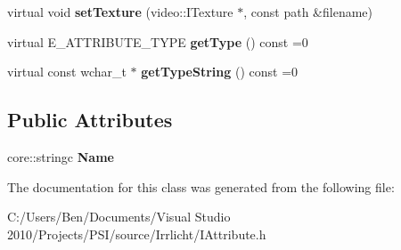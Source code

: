 \begin{DoxyCompactItemize}
\item 
\hypertarget{classirr_1_1io_1_1_i_attribute_ac0bc402be6c541b3f5dbca3fed2302a7}{virtual void {\bfseries set\-Texture} (video\-::\-I\-Texture $\ast$, const path \&filename)}\label{classirr_1_1io_1_1_i_attribute_ac0bc402be6c541b3f5dbca3fed2302a7}

\item 
\hypertarget{classirr_1_1io_1_1_i_attribute_a4d43d7be80a77f6da70fb2b5fbe8085e}{virtual E\-\_\-\-A\-T\-T\-R\-I\-B\-U\-T\-E\-\_\-\-T\-Y\-P\-E {\bfseries get\-Type} () const =0}\label{classirr_1_1io_1_1_i_attribute_a4d43d7be80a77f6da70fb2b5fbe8085e}

\item 
\hypertarget{classirr_1_1io_1_1_i_attribute_a3a7b07e87b462413e22e402d68bf9793}{virtual const wchar\-\_\-t $\ast$ {\bfseries get\-Type\-String} () const =0}\label{classirr_1_1io_1_1_i_attribute_a3a7b07e87b462413e22e402d68bf9793}

\end{DoxyCompactItemize}
\subsection*{Public Attributes}
\begin{DoxyCompactItemize}
\item 
\hypertarget{classirr_1_1io_1_1_i_attribute_a58afbce89d128d336c1f808c52a3d3e4}{core\-::stringc {\bfseries Name}}\label{classirr_1_1io_1_1_i_attribute_a58afbce89d128d336c1f808c52a3d3e4}

\end{DoxyCompactItemize}


The documentation for this class was generated from the following file\-:\begin{DoxyCompactItemize}
\item 
C\-:/\-Users/\-Ben/\-Documents/\-Visual Studio 2010/\-Projects/\-P\-S\-I/source/\-Irrlicht/I\-Attribute.\-h\end{DoxyCompactItemize}
